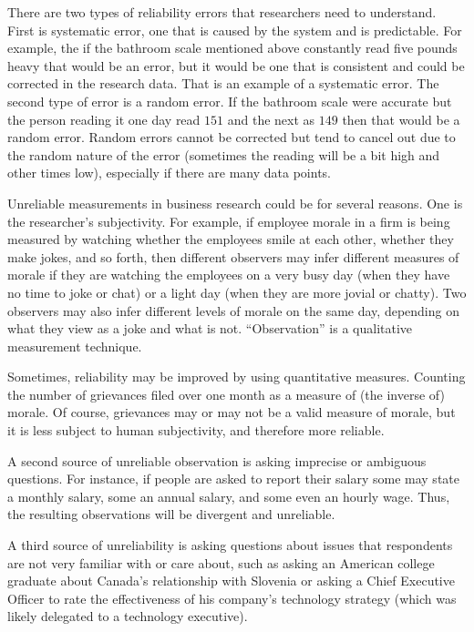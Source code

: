 There are two types of reliability errors that researchers need to understand. First is systematic error, one that is caused by the system and is predictable. For example, the if the bathroom scale mentioned above constantly read five pounds heavy that would be an error, but it would be one that is consistent and could be corrected in the research data. That is an example of a systematic error. The second type of error is a random error. If the bathroom scale were accurate but the person reading it one day read $ 151 $ and the next as $ 149 $ then that would be a random error. Random errors cannot be corrected but tend to cancel out due to the random nature of the error (sometimes the reading will be a bit high and other times low), especially if there are many data points.

Unreliable measurements in business research could be for several reasons. One is the researcher's subjectivity. For example, if employee morale in a firm is being measured by watching whether the employees smile at each other, whether they make jokes, and so forth, then different observers may infer different measures of morale if they are watching the employees on a very busy day (when they have no time to joke or chat) or a light day (when they are more jovial or chatty). Two observers may also infer different levels of morale on the same day, depending on what they view as a joke and what is not. ``Observation'' is a qualitative measurement technique. 

Sometimes, reliability may be improved by using quantitative measures. Counting the number of grievances filed over one month as a measure of (the inverse of) morale. Of course, grievances may or may not be a valid measure of morale, but it is less subject to human subjectivity, and therefore more reliable. 

A second source of unreliable observation is asking imprecise or ambiguous questions. For instance, if people are asked to report their salary some may state a monthly salary, some an annual salary, and some even an hourly wage. Thus, the resulting observations will be divergent and unreliable. 

A third source of unreliability is asking questions about issues that respondents are not very familiar with or care about, such as asking an American college graduate about Canada's relationship with Slovenia or asking a Chief Executive Officer to rate the effectiveness of his company's technology strategy (which was likely delegated to a technology executive).

